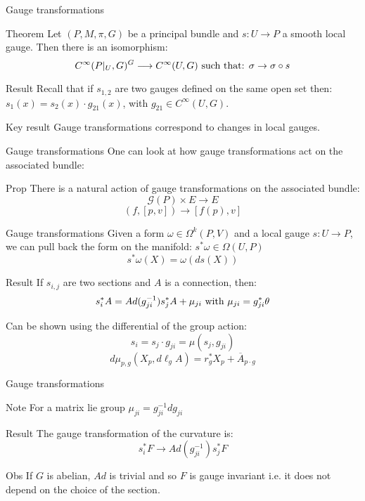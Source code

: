 \documentclass{beamer}
\begin{document}
\begin{frame}{Gauge transformations}
	\begin{alertblock}{Theorem}
		Let $(P,M,\pi,G)$ be a principal bundle and $s:U\rightarrow P$ a smooth local gauge. Then there is an isomorphism:
		$$C^\infty(P|_U,G)^G\longrightarrow C^\infty(U,G)\hbox{ such that: }\sigma\rightarrow \sigma\circ s$$
	\end{alertblock}
	\begin{block}{Result}
		Recall that if $s_{1,2}$ are two gauges defined on the same open set then: $s_1(x)=s_2(x)\cdot g_{21}(x)$, with $g_{21}\in C^\infty(U,G)$.
	\end{block}
	\begin{alertblock}{Key result}
		Gauge transformations correspond to changes in local gauges.
	\end{alertblock}
\end{frame}
\begin{frame}{Gauge transformations}
	One can look at how gauge transformations act on the associated bundle:
	\begin{alertblock}{Prop}
		There is a natural action of gauge transformations on the associated bundle:
		$$\mathcal{G}(P)\times E\rightarrow E$$
		$$(f,[p,v])\rightarrow [f(p),v]$$
	\end{alertblock}
\end{frame}
\begin{frame}{Gauge transformations}
	Given a form $\omega\in\Omega^k(P,V)$ and a local gauge $s:U\rightarrow P$, we can pull back the form on the manifold: $s^*\omega \in\Omega(U,P)$
	$$s^*\omega(X)=\omega(ds(X))$$
	\begin{block}{Result}
		If $s_{i,j}$ are two sections and $A$ is a connection, then:
		$$s_i^*A=Ad(g_{ji}^{-1})s^*_jA+\mu_{ji} \hbox{ with } \mu_{ji}=g^*_{ji}\theta$$
	\end{block}
	Can be shown using the differential of the group action:
	$$s_i=s_j\cdot g_{ji}=\mu(s_j,g_{ji})$$
	$$d\mu_{p,g}(X_p,d\ell_gA)=r_g^*X_p+\overline{A}_{p\cdot g}$$
\end{frame}
\begin{frame}{Gauge transformations}
	\begin{alertblock}{Note}
		For a matrix lie group $\mu_{ji}=g_{ji}^{-1}dg_{ji}$
	\end{alertblock}
	\begin{block}{Result}
		The gauge transformation of the curvature is:
		$$s_i^*F\rightarrow Ad(g_{ji}^{-1})s_j^*F$$
	\end{block}
	\begin{exampleblock}{Obs}
		If $G$ is abelian, $Ad$ is trivial and so $F$ is gauge invariant i.e. it does not depend on the choice of the section.
	\end{exampleblock}
\end{frame}
\end{document}
